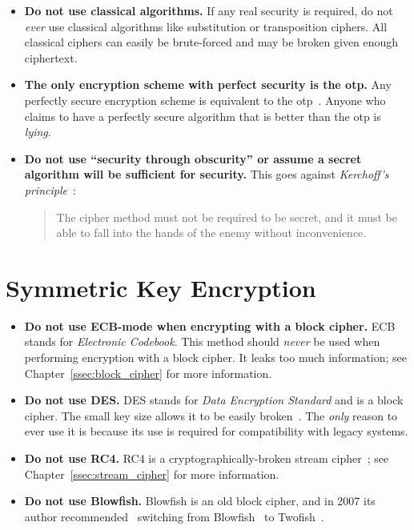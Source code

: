 \begin{itemize}
\item \textbf{Do not use classical algorithms.}
    If any real security is required, do not \emph{ever} use
    classical algorithms like substitution or transposition ciphers.
    All classical ciphers can easily be brute-forced and may
    be broken given enough ciphertext.

\item \textbf{The only \gls{encryption scheme} with \gls{perfect security}
    is the \gls{otp}.}
    Any perfectly secure encryption scheme is equivalent to the
    \gls{otp}~\cite[Theorems 2.10 and 2.11]{IntroModernCrypto}.
    Anyone who claims to have a perfectly secure algorithm
    that is better than the \gls{otp} is \emph{lying}.

\item \textbf{Do not use ``security through obscurity'' or
    assume a secret algorithm will be sufficient for security.}
    This goes against
    \emph{Kerchoff's principle}~\cite[Page 5]{IntroModernCrypto}:

\begin{quote}
    The cipher method must not be required to be secret,
    and it must be able to fall into the hands of the enemy
    without inconvenience.
\end{quote}

\end{itemize}

\section{Symmetric Key Encryption}

\begin{itemize}
\item \textbf{Do not use ECB-mode when encrypting with a \gls{block cipher}.}
    ECB stands for \emph{Electronic Codebook}.
    This method should \emph{never} be used when performing
    encryption with a \gls{block cipher}.
    It leaks too much information; see Chapter~\ref{ssec:block_cipher}
    for more information.
\item \textbf{Do not use DES.}
    DES stands for \emph{Data Encryption Standard} and is a \gls{block cipher}.
    The small key size allows it to be easily broken~\cite{rfc4772}.
    The \emph{only} reason to ever use it is because its use is required
    for compatibility with legacy systems.
\item \textbf{Do not use RC4.}
    RC4 is a cryptographically-broken \gls{stream cipher}~\cite{rfc7465};
    see Chapter~\ref{ssec:stream_cipher} for more information.
\item \textbf{Do not use Blowfish.}
    Blowfish is an old \gls{block cipher},
    and in 2007 its author recommended~\cite{SchneierNews2007}
    switching from Blowfish~\cite{BlowfishAlg} to Twofish~\cite{TwofishAlg}.
\end{itemize}

